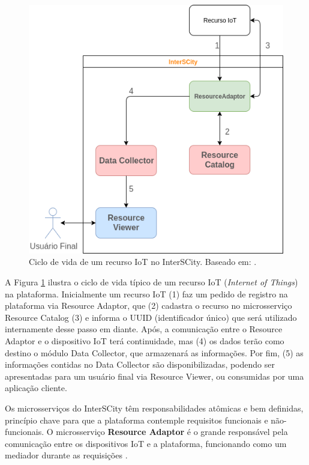 \begin{figure}
  \centering
    \includegraphics[scale=0.5]{figuras/interscity_flow.png}
  \caption{Ciclo de vida de um recurso IoT no InterSCity. Baseado em: .}

  \label{fig:interscity-lifecycle}
\end{figure}

A Figura \ref{fig:interscity-lifecycle} ilustra o ciclo de vida típico de um
recurso IoT (\textit{Internet of Things}) na plataforma. Inicialmente um recurso IoT (1) faz um pedido de
registro na plataforma via Resource Adaptor, que (2) cadastra o recurso no
microsserviço Resource Catalog (3) e informa o UUID
(identificador único) que será utilizado internamente desse passo em diante.
Após, a comunicação entre o Resource Adaptor e o dispositivo IoT terá
continuidade, mas (4) os dados terão como destino o módulo Data Collector,
que armazenará as informações. Por fim, (5) as informações contidas no
Data Collector são disponibilizadas, podendo ser apresentadas para um usuário
final via Resource Viewer, ou consumidas por uma aplicação cliente.

Os microsserviços do InterSCity têm responsabilidades atômicas e bem
definidas, princípio chave para que a plataforma contemple requisitos funcionais
e não-funcionais. O microsserviço \textbf{Resource Adaptor} é o grande
responsável pela comunicação entre os dispositivos IoT e a plataforma,
funcionando como um mediador durante as requisições \cite{delesposte2017}.

